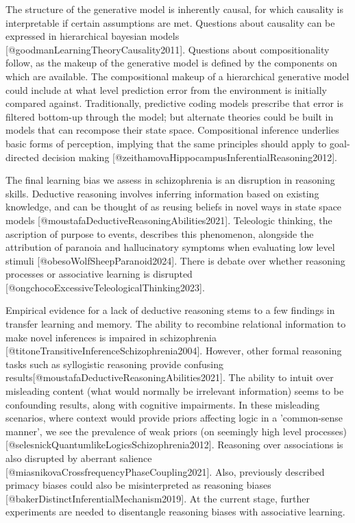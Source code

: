 \documentclass{article}
\begin{document}
The structure of the generative model is inherently causal, for which causality is interpretable if certain assumptions are met. Questions about causality can be expressed in hierarchical bayesian models [@goodmanLearningTheoryCausality2011]. Questions about compositionality follow, as the makeup of the generative model is defined by the components on which are available. The compositional makeup of a hierarchical generative model could include at what level prediction error from the environment is initially compared against. Traditionally, predictive coding models prescribe that error is filtered bottom-up through the model; but alternate theories could be built in models that can recompose their state space. Compositional inference underlies basic forms of perception, implying that the same principles should apply to goal-directed decision making [@zeithamovaHippocampusInferentialReasoning2012].

The final learning bias we assess in schizophrenia is an disruption in reasoning skills. Deductive reasoning involves inferring information based on existing knowledge, and can be thought of as reusing beliefs in novel ways in state space models [@moustafaDeductiveReasoningAbilities2021]. Teleologic thinking, the ascription of purpose to events, describes this phenomenon, alongside the attribution of paranoia and hallucinatory symptoms when evaluating low level stimuli [@obesoWolfSheepParanoid2024]. There is debate over whether reasoning processes or associative learning is disrupted [@ongchocoExcessiveTeleologicalThinking2023].

Empirical evidence for a lack of deductive reasoning stems to a few findings in transfer learning and memory. The ability to recombine relational information to make novel inferences is impaired in schizophrenia [@titoneTransitiveInferenceSchizophrenia2004]. However, other formal reasoning tasks such as syllogistic reasoning provide confusing results[@moustafaDeductiveReasoningAbilities2021]. The ability to intuit over misleading content (what would normally be irrelevant information) seems to be confounding results, along with cognitive impairments. In these misleading scenarios, where context would provide priors affecting logic in a 'common-sense manner', we see the prevalence of weak priors (on seemingly high level processes) [@selesnickQuantumlikeLogicsSchizophrenia2012]. Reasoning over associations is also disrupted by aberrant salience [@miasnikovaCrossfrequencyPhaseCoupling2021]. Also, previously described primacy biases could also be misinterpreted as reasoning biases [@bakerDistinctInferentialMechanism2019]. At the current stage, further experiments are needed to disentangle reasoning biases with associative learning.
\end{document}

